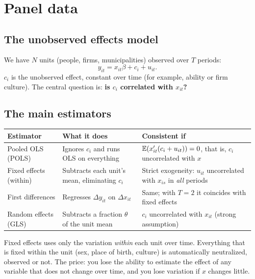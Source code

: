 \chapter{Panel data}
\label{cap:painel}

\section{The unobserved effects model}
We have $N$ units (people, firms, municipalities) observed over $T$ periods:
\[
y_{it}=x_{it}\beta+c_i+u_{it}.
\]
$c_i$ is the unobserved effect, constant over time (for example, ability or firm culture). The central question is: \textbf{is $c_i$ correlated with $x_{it}$?}

\section{The main estimators}
\begin{center}
\small
\begin{tabular}{p{3.4cm}p{5.3cm}p{5.2cm}}
\toprule
\textbf{Estimator} & \textbf{What it does} & \textbf{Consistent if} \\
\midrule
Pooled OLS (POLS) & Ignores $c_i$ and runs OLS on everything & $\mathbb{E}(x_{it}'(c_i+u_{it}))=0$, that is, $c_i$ uncorrelated with $x$ \\
Fixed effects (within) & Subtracts each unit's mean, eliminating $c_i$ & Strict exogeneity: $u_{it}$ uncorrelated with $x_{is}$ in \emph{all} periods \\
First differences & Regresses $\Delta y_{it}$ on $\Delta x_{it}$ & Same; with $T=2$ it coincides with fixed effects \\
Random effects (GLS) & Subtracts a fraction $\theta$ of the unit mean & $c_i$ uncorrelated with $x_{it}$ (strong assumption) \\
\bottomrule
\end{tabular}
\end{center}

\begin{intuicao}
Fixed effects uses only the variation \emph{within} each unit over time. Everything that is fixed within the unit (sex, place of birth, culture) is automatically neutralized, observed or not. The price: you lose the ability to estimate the effect of any variable that does not change over time, and you lose variation if $x$ changes little.
\end{intuicao}


